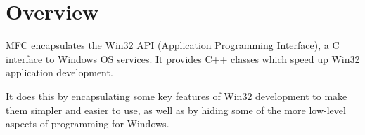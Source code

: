 \section{Overview}

MFC encapsulates the Win32 API (Application Programming Interface), a C interface to Windows OS services. It provides C++ classes which speed up Win32 application development.

It does this by encapsulating some key features of Win32 development to make them simpler and easier to use, as well as by hiding some of the more low-level aspects of programming for Windows.
